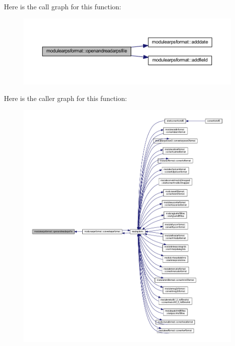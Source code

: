 Here is the call graph for this function\+:\nopagebreak
\begin{figure}[H]
\begin{center}
\leavevmode
\includegraphics[width=350pt]{namespacemodulearpsformat_a70ee83442772ea85df79da65ec4ea262_cgraph}
\end{center}
\end{figure}
Here is the caller graph for this function\+:\nopagebreak
\begin{figure}[H]
\begin{center}
\leavevmode
\includegraphics[width=350pt]{namespacemodulearpsformat_a70ee83442772ea85df79da65ec4ea262_icgraph}
\end{center}
\end{figure}
\mbox{\label{namespacemodulearpsformat_a3feae8181a739c2898e331dd969e3c67}} 
